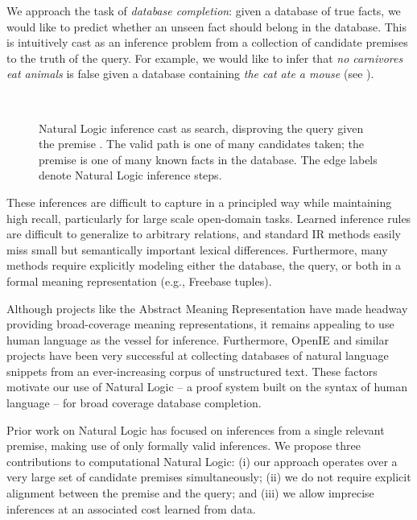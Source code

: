 We approach the task of \textit{database completion}: given a
  database of true facts, we would like to predict whether an unseen fact
  should belong in the database.
This is intuitively cast as an inference problem from 
  a collection of candidate premises to the truth of the query.
For example, we would like to infer 
  that \textit{no carnivores eat animals}
  is false given a database containing \textit{the cat ate a mouse}
  (see ).

\begin{figure}[th]
\begin{center}
  \resizebox{0.48\textwidth}{!}{\teaserSearch} \\
\end{center}
\caption{
  Natural Logic inference cast as search, disproving the
    query  given the premise
    .
  The valid path is one of many candidates taken; the premise
    is one of many known facts in the database.
  The edge labels denote Natural Logic inference steps.
  \label{fig:teaser}
}
\end{figure}

These inferences are difficult to capture in a principled way
  while maintaining high recall, particularly for 
  large scale open-domain tasks.
Learned inference rules are difficult to generalize to arbitrary
  relations, and standard IR methods easily miss small but
  semantically important lexical differences.
Furthermore, many methods require explicitly modeling either the
  database, the query, or both in a formal meaning representation
  (e.g., Freebase tuples).

Although projects like the Abstract Meaning Representation
  \cite{key:2013banarescu-amr} have made headway providing
  broad-coverage meaning representations, it remains 
  appealing to use human language as the vessel for
  inference.
Furthermore, OpenIE and similar projects have been very successful at
  collecting databases of natural language snippets
  from an ever-increasing corpus of unstructured text.
These factors motivate our use of Natural Logic -- a proof system built
  on the syntax of human language -- for
  broad coverage database completion.

Prior work on Natural Logic has focused on inferences from a single
  relevant premise, making use of only
  formally valid inferences.
We propose three contributions to computational Natural Logic:
  (i) our approach operates over a very large set of
    candidate premises simultaneously;
  (ii) we do not
    require explicit alignment between the premise and the query;
  and (iii) we allow imprecise inferences at an
    associated cost learned from data.

